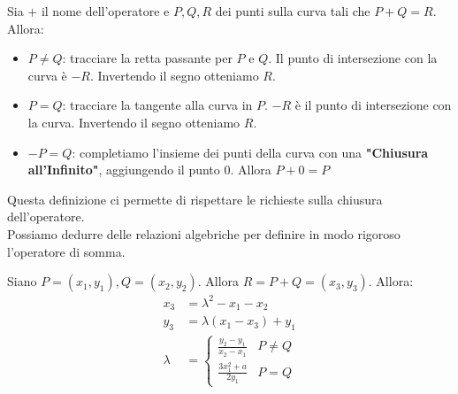 \begin{definition}\label{def:ecsum}
Sia $+$ il nome dell'operatore e $P,Q,R$ dei punti sulla curva tali che $P+Q=R$. Allora:
\begin{itemize}
    \item $P\ne Q$: tracciare la retta passante per $P$ e $Q$. Il punto di intersezione con la curva è $-R$. Invertendo il segno otteniamo $R$.
    \item $P=Q$: tracciare la tangente alla curva in $P$. $-R$ è il punto di intersezione con la curva. Invertendo il segno otteniamo $R$.
    \item $-P=Q$: completiamo l'insieme dei punti della curva con una \textbf{"Chiusura all'Infinito"}, aggiungendo il punto $0$. Allora $P+0=P$
\end{itemize}
\end{definition}
Questa definizione ci permette di rispettare le richieste sulla chiusura dell'operatore.\\
Possiamo dedurre delle relazioni algebriche per definire in modo rigoroso l'operatore di somma.
\begin{theorem}\label{thm:ecalg}
Siano $P=(x_1,y_1),Q=(x_2,y_2)$. Allora $R=P+Q=(x_3,y_3)$. Allora:
\begin{equation}\label{eq:ecalg}
    \begin{aligned}
    x_3&=\lambda^2-x_1-x_2\\
    y_3&=\lambda(x_1-x_3)+y_1\\
    \lambda&=\begin{cases}
    \frac{y_2-y_1}{x_2-x_1}&P\ne Q\\
    \frac{3x_1^2+a}{2y_1}&P=Q
    \end{cases}
    \end{aligned}
\end{equation}
\end{theorem}
